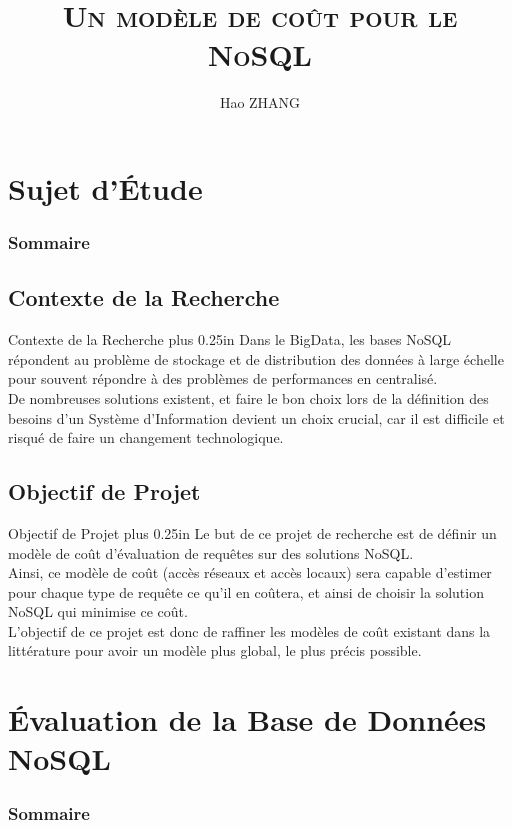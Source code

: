 \documentclass[xcolor=dvipsnames]{beamer}
\title[Sujet n°15]{\textsc{Un modèle de coût pour le NoSQL}}
\author{Hao ZHANG}
\institute{\texttt{Parcours Recherche 2018--2019}}
\date{\displaydate{date}}
\renewcommand{\raggedright}{\leftskip=0pt \rightskip=0pt plus 0.25in}
\begin{document}
\begin{frame}
	\titlepage
\end{frame}

\section{Sujet d'Étude}
\begin{frame}
	\frametitle{Sommaire}
	\tableofcontents[currentsection]
\end{frame}

\subsection{Contexte de la Recherche}
\begin{frame}{Contexte de la Recherche}
	\raggedright
	Dans le BigData, les bases NoSQL répondent au problème de stockage et de distribution des données à large échelle pour souvent répondre à des problèmes de performances en centralisé.\\
	\vspace{1em}
	De nombreuses solutions existent, et faire le bon choix lors de la définition des besoins d’un Système d'Information devient un choix crucial, car il est difficile et risqué de faire un changement technologique.
\end{frame}

\subsection{Objectif de Projet}
\begin{frame}{Objectif de Projet}
	\raggedright
	Le but de ce projet de recherche est de définir un modèle de coût d’évaluation de requêtes sur des solutions NoSQL.\\
	\vspace{1em}
	Ainsi, ce modèle de coût (accès réseaux et accès locaux) sera capable d’estimer pour chaque type de requête ce qu’il en coûtera, et ainsi de choisir la solution NoSQL qui minimise ce coût.\\
	\vspace{1em}
	L'objectif de ce projet est donc de raffiner les modèles de coût existant dans la littérature pour avoir un modèle plus global, le plus précis possible. 
\end{frame}

\section{Évaluation de la Base de Données NoSQL}
\begin{frame}
\frametitle{Sommaire}
\tableofcontents[currentsection]
\end{frame}
\end{document}
